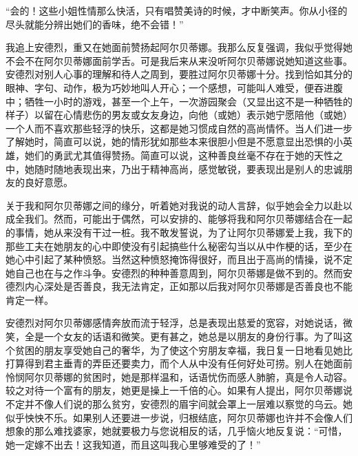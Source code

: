 \par “会的！这些小姐性情那么快活，只有唱赞美诗的时候，才中断笑声。你从小径的尽头就能分辨出她们的香味，绝不会错！”
\par 我追上安德烈，重又在她面前赞扬起阿尔贝蒂娜。我那么反复强调，我似乎觉得她不会不在阿尔贝蒂娜面前学舌。可是我后来从来没听阿尔贝蒂娜说她知道这些事。安德烈对别人心事的理解和待人之周到，要胜过阿尔贝蒂娜十分。找到恰如其分的眼神、字句、动作，极为巧妙地叫人开心；一个感想，可能叫人难受，便吞进腹中；牺牲一小时的游戏，甚至一个上午，一次游园聚会（又显出这不是一种牺牲的样子）以留在心情悲伤的男友或女友身边，向他（或她）表示她宁愿陪他（或她）一个人而不喜欢那些轻浮的快乐，这都是她习惯成自然的高尚情怀。当人们进一步了解她时，简直可以说，她的情形犹如那些本来很胆小但是不愿意显出恐惧的小英雄，她们的勇武尤其值得赞扬。简直可以说，这种善良丝毫不存在于她的天性之中，她随时随地表现出来，乃出于精神高尚，感觉敏锐，要表现出是别人的忠诚朋友的良好意愿。
\par 关于我和阿尔贝蒂娜之间的缘分，听着她对我说的动人言辞，似乎她会全力以赴以成全我们。然而，可能出于偶然，可以安排的、能够将我和阿尔贝蒂娜结合在一起的事情，她从来没有干过一桩。我不敢发誓说，为了让阿尔贝蒂娜爱上我，我下的那些工夫在她朋友的心中即使没有引起搞些什么秘密勾当以从中作梗的话，至少在她心中引起了某种愤怒。当然这种愤怒掩饰得很好，而且出于高尚的情操，说不定她自己也在与之作斗争。安德烈的种种善意周到，阿尔贝蒂娜是做不到的。然而安德烈内心深处是否善良，我无法肯定，正如那以后我对阿尔贝蒂娜是否善良也不能肯定一样。
\par 安德烈对阿尔贝蒂娜感情奔放而流于轻浮，总是表现出慈爱的宽容，对她说话，微笑，全是一个女友的话语和微笑。更有甚之，她总是以朋友的身份行事。为了叫这个贫困的朋友享受她自己的奢华，为了使这个穷朋友幸福，我日复一日地看见她比打算得到君主垂青的弄臣还要卖力，而个人从中没有任何好处可捞。别人在她面前怜悯阿尔贝蒂娜的贫困时，她是那样温和，话语忧伤而感人肺腑，真是令人动容。较之对待一个富有的朋友，她更是操上一千倍的心。如果有人提出，阿尔贝蒂娜说不定并不像人们说的那么贫穷，安德烈的眉宇间就会罩上一层难以察觉的乌云。她似乎怏怏不乐。如果别人还要进一步说，归根结底，阿尔贝蒂娜也许并不会像人们想象的那么难找婆家，她就要极力与您说相反的话，几乎恼火地反复说：“可惜，她一定嫁不出去！这我知道，而且这叫我心里够难受的了！”
